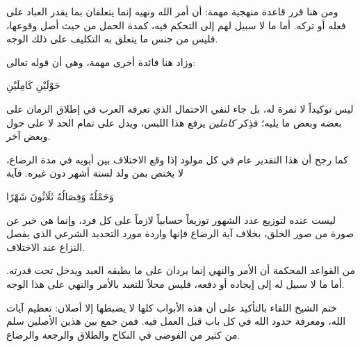 ومن هنا قرر قاعدة منهجية مهمة: أن أمر الله ونهيه إنما يتعلقان بما يقدر العباد على فعله أو تركه. أما ما لا سبيل لهم إلى التحكم فيه، كمدة الحمل من حيث أصل وقوعها، فليس من جنس ما يتعلق به التكليف على ذلك الوجه.

وزاد  هنا فائدة أخرى مهمة، وهي أن قوله تعالى: \begin{ayah}حَوْلَيْنِ كَامِلَيْنِ\end{ayah} ليس توكيداً لا ثمرة له، بل جاء لنفي الاحتمال الذي تعرفه العرب في إطلاق الزمان على بعضه وبعض ما يليه؛ فذِكر \textit{كاملين} يرفع هذا اللبس، ويدل على تمام الحد لا على حول وبعض آخر.

كما رجح أن هذا التقدير عام في كل مولود إذا وقع الاختلاف بين أبويه في مدة الرضاع، لا يختص بمن ولد لستة أشهر دون غيره. فآية \begin{ayah}وَحَمْلُهُ وَفِصَالُهُ ثَلَاثُونَ شَهْرًا\end{ayah} ليست عنده لتوزيع عدد الشهور توزيعاً حسابياً لازماً على كل فرد، وإنما هي خبر عن صورة من صور الخلق، بخلاف آية الرضاع فإنها واردة مورد التحديد الشرعي الذي يفصل النزاع عند الاختلاف.

\begin{fawaid}
من القواعد المحكمة أن الأمر والنهي إنما يردان على ما يطيقه العبد ويدخل تحت قدرته. أما ما لا سبيل له إلى إيجاده أو دفعه، فليس محلاً للتعبد بالأمر والنهي على هذا الوجه.
\end{fawaid}

\separator

ختم الشيخ اللقاء بالتأكيد على أن هذه الأبواب كلها لا يضبطها إلا أصلان: تعظيم آيات الله، ومعرفة حدود الله في كل باب قبل العمل فيه. فمن جمع بين هذين الأصلين سلم من كثير من الفوضى في النكاح والطلاق والرجعة والرضاع.
